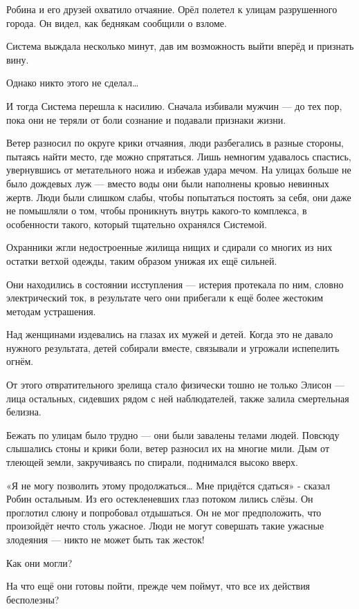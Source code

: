 \documentclass[a5paper, 9pt,
final, openany, twoside=true]{memoir}
\begin{document}
Робина и его друзей охватило отчаяние. Орёл полетел к улицам разрушенного города. Он видел, как беднякам сообщили о взломе.

Система выждала несколько минут, дав им возможность выйти вперёд и признать вину.

Однако никто этого не сделал…

И тогда Система перешла к насилию. Сначала избивали мужчин — до тех пор, пока они не теряли от боли сознание и подавали признаки жизни.

Ветер разносил по округе крики отчаяния, люди разбегались в разные стороны, пытаясь найти место, где можно спрятаться. Лишь немногим удавалось спастись, увернувшись от метательного ножа и избежав удара мечом. На улицах больше не было дождевых луж — вместо воды они были наполнены кровью невинных жертв. Люди были слишком слабы, чтобы попытаться постоять за себя, они даже не помышляли о том, чтобы проникнуть внутрь какого-то комплекса, в особенности такого, который тщательно охранялся Системой.\bigskip

Охранники жгли недостроенные жилища нищих и сдирали со многих из них остатки ветхой одежды, таким образом унижая их ещё сильней.

Они находились в состоянии исступления — истерия протекала по ним, словно электрический ток, в результате чего они прибегали к ещё более жестоким методам устрашения.

Над женщинами издевались на глазах их мужей и детей. Когда это не давало нужного результата, детей собирали вместе, связывали и угрожали испепелить огнём.

От этого отвратительного зрелища стало физически тошно не только Элисон — лица остальных, сидевших рядом с ней наблюдателей, также залила смертельная белизна.\bigskip

Бежать по улицам было трудно — они были завалены телами людей. Повсюду слышались стоны и крики боли, ветер разносил их на многие мили. Дым от тлеющей земли, закручиваясь по спирали, поднимался высоко вверх.

«Я не могу позволить этому продолжаться… Мне придётся сдаться» - сказал Робин остальным. Из его остекленевших глаз потоком лились слёзы. Он проглотил слюну и попробовал отдышаться. Он не мог предположить, что произойдёт нечто столь ужасное. Люди не могут совершать такие ужасные злодеяния — никто не может быть так жесток!

Как они могли?

На что ещё они готовы пойти, прежде чем поймут, что все их действия бесполезны?\bigskip
\end{document}
